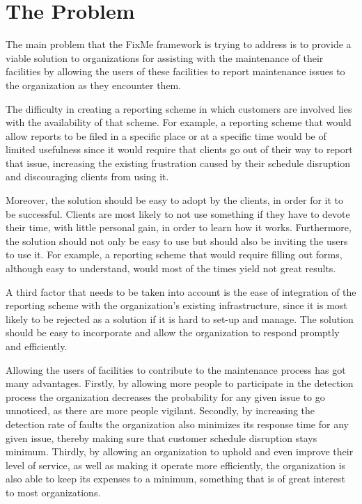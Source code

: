 \documentclass[12pt]{ecsproject}     %
\begin{document}
\section{The Problem}
The main problem that the FixMe framework is trying to address is to provide a viable solution to organizations for assisting with the maintenance of their facilities by allowing the users of these facilities to report maintenance issues to the organization as they encounter them.

The difficulty in creating a reporting scheme in which customers are involved lies with the availability of that scheme. For example, a reporting scheme that would allow reports to be filed in a specific place or at a specific time would be of limited usefulness since it would require that clients go out of their way to report that issue, increasing the existing frustration caused by their schedule disruption and discouraging clients from using it. 

Moreover, the solution should be easy to adopt by the clients, in order for it to be successful. Clients are most likely to not use something if they have to devote their time, with little personal gain, in order to learn how it works. Furthermore, the solution should not only be easy to use but should also be inviting the users to use it. For example, a reporting scheme that would require filling out forms, although easy to understand, would most of the times yield not great results.

A third factor that needs to be taken into account is the ease of integration of the reporting scheme with the organization's existing infrastructure, since it is most likely to be rejected as a solution if it is hard to set-up and manage. The solution should be easy to incorporate and allow the organization to respond promptly and efficiently.

Allowing the users of facilities to contribute to the maintenance process has got many advantages. Firstly, by allowing more people to participate in the detection process the organization decreases the probability for any given issue to go unnoticed, as there are more people vigilant. Secondly, by increasing the detection rate of faults the organization also minimizes its response time for any given issue, thereby making sure that customer schedule disruption stays minimum. Thirdly, by allowing an organization to uphold and even improve their level of service, as well as making it operate more efficiently, the organization is also able to keep its expenses to a minimum, something that is of great interest to most organizations.
\end{document}
